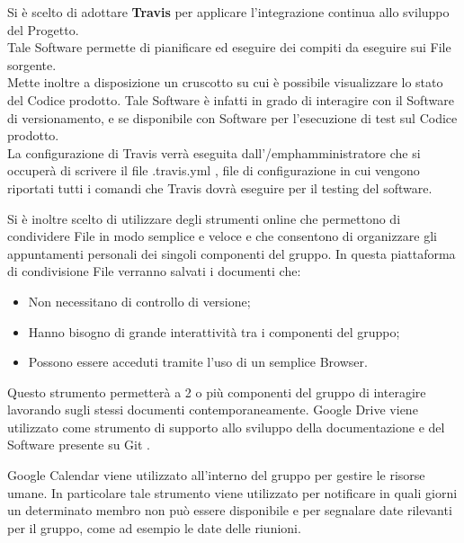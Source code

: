 
Si è scelto di adottare \textbf{Travis} per applicare l’integrazione continua allo sviluppo del Progetto.\\ 
Tale Software permette di pianificare ed eseguire dei compiti da eseguire sui File sorgente.\\
Mette inoltre a disposizione un cruscotto su cui è possibile visualizzare lo stato del Codice prodotto. Tale Software è infatti in grado di interagire con il Software di versionamento, e se disponibile con Software per l’esecuzione di test sul Codice prodotto.\\ 
La configurazione di Travis verrà eseguita dall'/emph{amministratore} che si occuperà di scrivere il file .travis.yml , file di configurazione in cui vengono riportati tutti i comandi che Travis dovrà eseguire per il testing del software.

  \label{sec:condivisioneFile}
  Si è inoltre scelto di utilizzare degli strumenti online che permettono di condividere File
  in modo semplice e veloce e che consentono di organizzare gli appuntamenti personali
  dei singoli componenti del gruppo.
  In questa piattaforma di condivisione File verranno salvati i documenti che:
  \begin{itemize}
  
  
  \item Non necessitano di controllo di versione;
  \item Hanno bisogno di grande interattività tra i componenti del gruppo;
  \item Possono essere acceduti tramite l’uso di un semplice Browser.
   \end{itemize}
  Questo strumento permetterà a 2 o più componenti del gruppo di interagire lavorando sugli stessi documenti contemporaneamente. Google Drive viene utilizzato come strumento di supporto allo sviluppo della documentazione e del Software presente su Git .
  


 
Google Calendar viene utilizzato all’interno del gruppo per gestire le risorse umane. In
particolare tale strumento viene utilizzato per notificare in quali giorni un determinato
membro non può essere disponibile e per segnalare date rilevanti per il gruppo, come
ad esempio le date delle riunioni.
